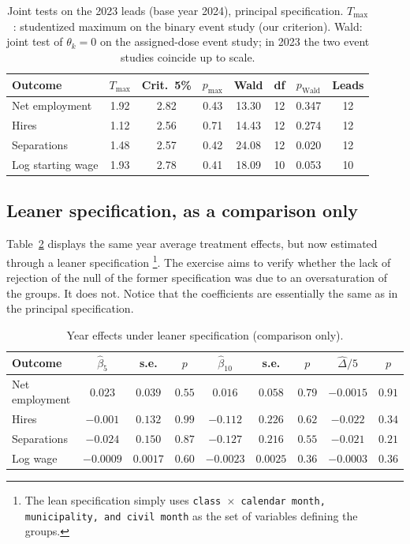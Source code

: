 \documentclass[12pt,a4paper]{article}
\begin{document}
\begin{table}[H]
\centering
\caption{Joint tests on the 2023 leads (base year 2024), principal specification. $T_{\max}$: studentized maximum on the binary event study (our criterion). Wald: joint test of $\theta_k=0$ on the assigned-dose event study; in 2023 the two event studies coincide up to scale.}
\label{tab:tmax}
\begin{tabular}{lccccccc}
\toprule
Outcome & $T_{\max}$ & Crit.\ 5\% & $p_{\max}$ & Wald & df & $p_{\text{Wald}}$ & Leads \\
\midrule
Net employment & 1.92 & 2.82 & 0.43 & 13.30 & 12 & 0.347 & 12 \\
Hires & 1.12 & 2.56 & 0.71 & 14.43 & 12 & 0.274 & 12 \\
Separations & 1.48 & 2.57 & 0.42 & 24.08 & 12 & 0.020 & 12 \\
Log starting wage & 1.93 & 2.78 & 0.41 & 18.09 & 10 & 0.053 & 10 \\
\bottomrule
\end{tabular}
\end{table}

\subsection{Leaner specification, as a comparison only}

Table~\ref{tab:lean} displays the same year average treatment effects, but now estimated through a leaner specification \footnote{The lean specification simply uses \texttt{class $\times$ calendar month, municipality, and civil month} as the set of variables defining the groups.}. The exercise aims to verify whether the lack of rejection of the null of the former specification was due to an oversaturation of the groups. It does not. Notice that the coefficients are essentially the same as in the principal specification.

\begin{table}[H]
\centering
\caption{Year effects under leaner specification (comparison only).}
\label{tab:lean}
{\footnotesize
\setlength{\tabcolsep}{3pt}
\begin{tabular}{lcccccccc}
\toprule
Outcome & $\hat\beta_5$ & s.e. & $p$ & $\hat\beta_{10}$ & s.e. & $p$ & $\widehat{\Delta}/5$ & $p$ \\
\midrule
Net employment & $0.023$ & $0.039$ & $0.55$ & $0.016$ & $0.058$ & $0.79$ & $-0.0015$ & $0.91$ \\
Hires & $-0.001$ & $0.132$ & $0.99$ & $-0.112$ & $0.226$ & $0.62$ & $-0.022$ & $0.34$ \\
Separations & $-0.024$ & $0.150$ & $0.87$ & $-0.127$ & $0.216$ & $0.55$ & $-0.021$ & $0.21$ \\
Log wage & $-0.0009$ & $0.0017$ & $0.60$ & $-0.0023$ & $0.0025$ & $0.36$ & $-0.0003$ & $0.36$ \\
\bottomrule
\end{tabular}}
\end{table}
\end{document}
